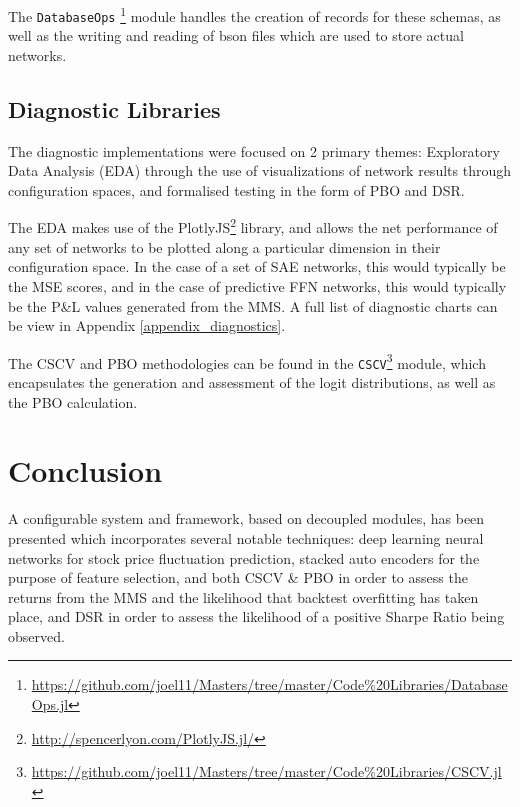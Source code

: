 \documentclass[a4paper,11pt,oneside]{article}
\theoremstyle{plain}
\theoremstyle{definition}
\begin{document}
	The \texttt{DatabaseOps} \footnote{\url{https://github.com/joel11/Masters/tree/master/Code\%20Libraries/DatabaseOps.jl}} module handles the creation of records for these schemas, as well as the writing and reading of bson files which are used to store actual networks.
	
	\subsection{Diagnostic Libraries}
	
	The diagnostic implementations were focused on 2 primary themes: Exploratory Data Analysis (EDA) through the use of visualizations of network results through configuration spaces, and formalised testing in the form of PBO and DSR.
	
	The EDA makes use of the PlotlyJS\footnote{\url{http://spencerlyon.com/PlotlyJS.jl/}} library, and allows the net performance of any set of networks to be plotted along a particular dimension in their configuration space. In the case of a set of SAE networks, this would typically be the MSE scores, and in the case of predictive FFN networks, this would typically be the P\&L values generated from the MMS. A full list of diagnostic charts can be view in Appendix \ref{appendix_diagnostics}. \newline
	
	The CSCV and PBO methodologies can be found in the \texttt{CSCV}\footnote{\url{https://github.com/joel11/Masters/tree/master/Code\%20Libraries/CSCV.jl}} module, which encapsulates the generation and assessment of the logit distributions, as well as the PBO calculation.
	
	
	\newpage
	\section{Conclusion}\label{Conclusion}
	
	A configurable system and framework, based on decoupled modules, has been presented which incorporates several notable techniques: deep learning neural networks for stock price fluctuation prediction, stacked auto encoders for the purpose of feature selection, and both CSCV \& PBO in order to assess the returns from the MMS and the likelihood that backtest overfitting has taken place, and DSR in order to assess the likelihood of a positive Sharpe Ratio being observed. \newline 
	
\end{document}
